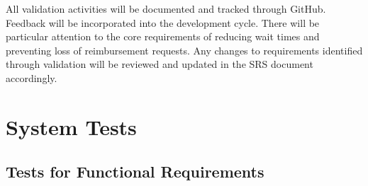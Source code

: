\documentclass[12pt, titlepage]{article}
\begin{document}
All validation activities will be documented and tracked through GitHub. Feedback will be incorporated into the development cycle. There will be particular attention to the core requirements of reducing wait times and preventing loss of reimbursement requests. Any changes to requirements identified through validation will be reviewed and updated in the SRS document accordingly.

\section{System Tests}

\subsection{Tests for Functional Requirements}
\end{document}
